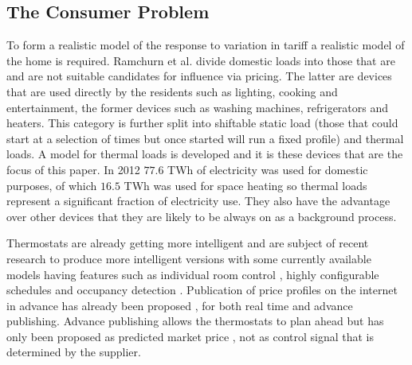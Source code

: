 \documentclass[a4paper, 10 pt, conference]{ieeeconf}  %
\begin{document}




\subsection{The Consumer Problem}
To form a realistic model of the response to variation in tariff a realistic model of the home is required. Ramchurn et al. \cite{ramchurn2011agent} divide domestic loads into those that are and are not suitable candidates for influence via pricing. The latter are devices that are used directly by the residents such as lighting, cooking and entertainment, the former devices such as washing machines, refrigerators and heaters. This category is further split into shiftable static load (those that could start at a selection of times but once started will run a fixed profile) and thermal loads. A model for thermal loads is developed and it is these devices that are the focus of this paper. In 2012 $77.6 $ TWh of electricity was used for domestic purposes, of which $16.5 $ TWh was used for space heating \cite{ecuk_data} so thermal loads represent a significant fraction of electricity use. They also have the advantage over other devices that they are likely to be always on as a background process.

Thermostats are already getting more intelligent and are subject of recent research to produce more intelligent versions \cite{rogers2011adaptive} \cite{ramchurn2013agentswitch} with some currently available models having features such as individual room control \cite{honeywell}, highly configurable schedules \cite{nest} and occupancy detection \cite{tado}. Publication of price profiles on the internet in advance has already been proposed \cite{ramchurn2011agenthomeo}, for both real time and advance publishing. Advance publishing allows the thermostats to plan ahead but has only been proposed as predicted market price \cite{rogers2011adaptive}, not as control signal that is determined by the supplier.
\end{document}
